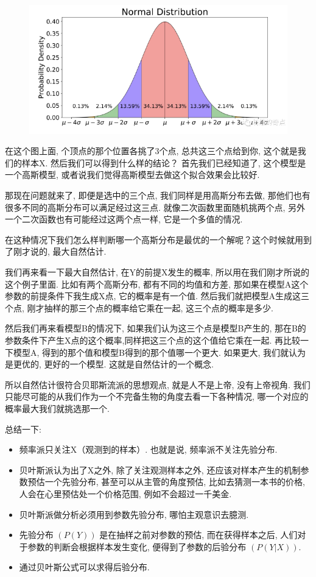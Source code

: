 \begin{figure}[ht]
  \centering
  \includegraphics[width=1\linewidth]{asset/20231227144618.png}
  \caption{}
  \label{fig:img23_1}
\end{figure}

在这个图上面, 个顶点的那个位置各挑了3个点, 总共这三个点给到你, 这个就是我们的样本X. 然后我们可以得到什么样的结论？
首先我们已经知道了, 这个模型是一个高斯模型, 或者说我们觉得高斯模型去做这个拟合效果会比较好. 

那现在问题就来了, 即便是选中的三个点, 我们同样是用高斯分布去做, 那他们也有很多不同的高斯分布可以满足经过这三点. 就像二次函数里面随机挑两个点, 另外一个二次函数也有可能经过这两个点一样, 它是一个多值的情况. 

在这种情况下我们怎么样判断哪一个高斯分布是最优的一个解呢？这个时候就用到了刚才说的, 最大自然估计. 

我们再来看一下最大自然估计, 在Y的前提X发生的概率, 所以用在我们刚才所说的这个例子里面. 比如有两个高斯分布, 都有不同的均值和方差, 那如果在模型A这个参数的前提条件下我生成X点, 它的概率是有一个值. 然后我们就把模型A生成这三个点, 刚才抽样的那三个点的概率给它乘在一起, 这三个点的概率是多少. 

然后我们再来看模型B的情况下, 如果我们认为这三个点是模型B产生的, 那在B的参数条件下产生X点的这个概率,同样把这三个点的这个值给它乘在一起. 再比较一下模型A, 得到的那个值和模型B得到的那个值哪一个更大. 如果更大, 我们就认为是更优的, 更好的一个模型. 这就是自然估计的一个概念. 

所以自然估计很符合贝耶斯流派的思想观点, 就是人不是上帝, 没有上帝视角. 我们只能尽可能的从我们作为一个不完备生物的角度去看一下各种情况, 哪一个对应的概率最大我们就挑选那一个. 

总结一下: 
\begin{itemize}
  \item 频率派只关注X（观测到的样本）. 也就是说, 频率派不关注先验分布. 
  \item 贝叶斯派认为出了X之外, 除了关注观测样本之外, 还应该对样本产生的机制参数预估一个先验分布, 甚至可以从主管的角度预估, 比如去猜测一本书的价格, 人会在心里预估处一个价格范围, 例如不会超过一千美金. 
  \item 贝叶斯派做分析必须用到参数先验分布, 哪怕主观意识去臆测. 
  \item 先验分布 $(P(Y))$ 是在抽样之前对参数的预估, 而在获得样本之后, 人们对于参数的判断会根据样本发生变化, 便得到了参数的后验分布 $(P(Y|X))$. 
  \item 通过贝叶斯公式可以求得后验分布. 
\end{itemize}

